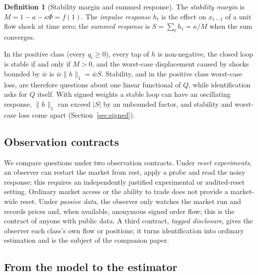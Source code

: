 \documentclass[12pt]{article}
\theoremstyle{definition}
\newtheorem{definition}[theorem]{Definition}
\theoremstyle{remark}
\begin{document}
\begin{definition}[Stability margin and summed response]\label{def:margin}
The \emph{stability margin} is $M=1-a-\kappa\Phi=f(1)$. The \emph{impulse response} $h_t$ is the effect on $x_{t-1}$ of a unit flow shock at time zero; the \emph{summed response} is $S=\sum_th_t=\kappa/M$ when the sum converges.
\end{definition}

In the positive class (every $q_i\ge0$), every tap of $h$ is non-negative, the closed loop is stable if and only if $M>0$, and the worst-case displacement caused by shocks bounded by $\bar w$ is $\bar w\|h\|_1=\bar wS$. Stability, and in the positive class worst-case loss, are therefore questions about one linear functional of $Q$, while identification asks for $Q$ itself. With signed weights a stable loop can have an oscillating response, $\|h\|_1$ can exceed $|S|$ by an unbounded factor, and stability and worst-case loss come apart (Section~\ref{sec:signed}).

\subsection{Observation contracts}

We compare questions under two observation contracts. Under \emph{reset experiments}, an observer can restart the market from rest, apply a probe and read the noisy response; this requires an independently justified experimental or audited-reset setting. Ordinary market access or the ability to trade does not provide a market-wide reset. Under \emph{passive data}, the observer only watches the market run and records prices and, when available, anonymous signed order flow; this is the contract of anyone with public data. A third contract, \emph{tagged disclosure}, gives the observer each class's own flow or positions; it turns identification into ordinary estimation and is the subject of the companion paper.

\subsection{From the model to the estimator}\label{sec:reduced}
\end{document}
